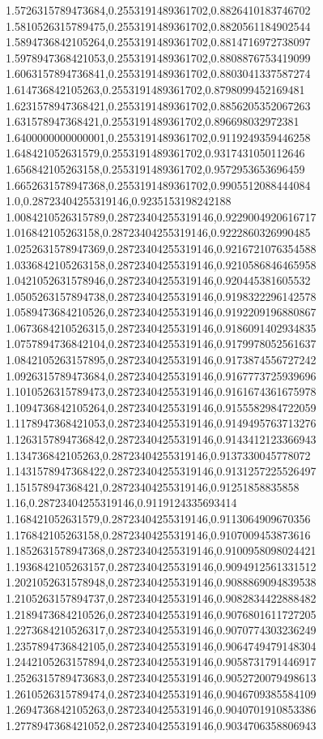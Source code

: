 1.5726315789473684,0.2553191489361702,0.8826410183746702
1.5810526315789475,0.2553191489361702,0.8820561184902544
1.5894736842105264,0.2553191489361702,0.8814716972738097
1.5978947368421053,0.2553191489361702,0.8808876753419099
1.6063157894736841,0.2553191489361702,0.8803041337587274
1.614736842105263,0.2553191489361702,0.8798099452169481
1.6231578947368421,0.2553191489361702,0.8856205352067263
1.631578947368421,0.2553191489361702,0.896698032972381
1.6400000000000001,0.2553191489361702,0.9119249359446258
1.648421052631579,0.2553191489361702,0.9317431050112646
1.656842105263158,0.2553191489361702,0.9572953653696459
1.6652631578947368,0.2553191489361702,0.9905512088444084
1.0,0.28723404255319146,0.9235153198242188
1.0084210526315789,0.28723404255319146,0.9229004920616717
1.016842105263158,0.28723404255319146,0.9222860326990485
1.0252631578947369,0.28723404255319146,0.9216721076354588
1.0336842105263158,0.28723404255319146,0.9210586846465958
1.0421052631578946,0.28723404255319146,0.920445381605532
1.0505263157894738,0.28723404255319146,0.9198322296142578
1.0589473684210526,0.28723404255319146,0.9192209196880867
1.0673684210526315,0.28723404255319146,0.9186091402934835
1.0757894736842104,0.28723404255319146,0.9179978052561637
1.0842105263157895,0.28723404255319146,0.9173874556727242
1.0926315789473684,0.28723404255319146,0.9167773725939696
1.1010526315789473,0.28723404255319146,0.9161674361675978
1.1094736842105264,0.28723404255319146,0.9155582984722059
1.1178947368421053,0.28723404255319146,0.9149495763713276
1.1263157894736842,0.28723404255319146,0.9143412123366943
1.134736842105263,0.28723404255319146,0.9137330045778072
1.1431578947368422,0.28723404255319146,0.9131257225526497
1.151578947368421,0.28723404255319146,0.91251858835858
1.16,0.28723404255319146,0.9119124335693414
1.168421052631579,0.28723404255319146,0.9113064909670356
1.176842105263158,0.28723404255319146,0.9107009453873616
1.1852631578947368,0.28723404255319146,0.9100958098024421
1.1936842105263157,0.28723404255319146,0.9094912561331512
1.2021052631578948,0.28723404255319146,0.9088869094839538
1.2105263157894737,0.28723404255319146,0.9082834422888482
1.2189473684210526,0.28723404255319146,0.9076801611727205
1.2273684210526317,0.28723404255319146,0.9070774303236249
1.2357894736842105,0.28723404255319146,0.9064749479148304
1.2442105263157894,0.28723404255319146,0.9058731791446917
1.2526315789473683,0.28723404255319146,0.9052720079498613
1.2610526315789474,0.28723404255319146,0.9046709385584109
1.2694736842105263,0.28723404255319146,0.9040701910853386
1.2778947368421052,0.28723404255319146,0.9034706358806943
